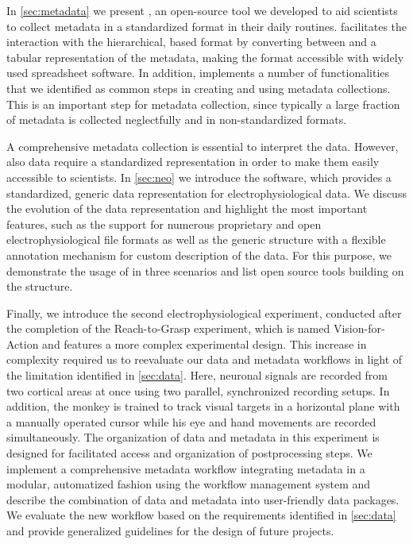 In \cref{sec:metadata} we present , an open-source tool we developed to aid scientists to collect metadata in a standardized format in their daily routines.  facilitates the interaction with the hierarchical,  based  format by converting between  and a tabular representation of the metadata, making the  format accessible with widely used spreadsheet software. In addition,  implements a number of functionalities that we identified as common steps in creating and using metadata collections. This is an important step for metadata collection, since typically a large fraction of metadata is collected neglectfully and in non-standardized formats.

A comprehensive metadata collection is essential to interpret the data. However, also data require a standardized representation in order to make them easily accessible to scientists. In \cref{sec:neo} we introduce the  software, which provides a standardized, generic data representation for electrophysiological data. We discuss the evolution of the  data representation and highlight the most important features, such as the support for numerous proprietary and open electrophysiological file formats as well as the generic structure with a flexible annotation mechanism for custom description of the data. For this purpose, we demonstrate the usage of  in three scenarios and list open source tools building on the  structure.

Finally, we introduce the second electrophysiological experiment, conducted after the completion of the Reach-to-Grasp experiment, which is named Vision-for-Action and features a more complex experimental design. This increase in complexity required us to reevaluate our data and metadata workflows in light of the limitation identified in \cref{sec:data}. Here, neuronal signals are recorded from two cortical areas at once using two parallel, synchronized recording setups. In addition, the monkey is trained to track visual targets in a horizontal plane with a manually operated cursor while his eye and hand movements are recorded simultaneously. The organization of data and metadata in this experiment is designed for facilitated access and organization of postprocessing steps. We implement a comprehensive metadata workflow integrating metadata in a modular, automatized fashion using the  workflow management system and describe the combination of data and metadata into user-friendly data packages. We evaluate the new workflow based on the requirements identified in \cref{sec:data} and provide generalized guidelines for the design of future projects.

